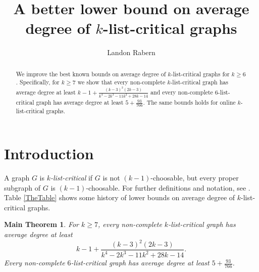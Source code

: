 \documentclass[10pt]{article}
\title{A better lower bound on average degree of $k$-list-critical graphs}
\author{Landon Rabern}
\renewcommand{\ge}{\geqslant}
\theoremstyle{plain}
\newtheorem*{MainTheorem}{Main Theorem}
\theoremstyle{definition}
\theoremstyle{remark}
\begin{document}
\maketitle

\begin{abstract}
		We improve the best known bounds on average degree of $k$-list-critical graphs for $k \ge 6$. 
		Specifically, for $k \ge 7$ we show that every non-complete $k$-list-critical graph has average degree at least $k-1 + \frac{(k-3)^2 (2 k-3)}{k^4-2 k^3-11 k^2+28 k-14}$
		and every non-complete $6$-list-critical graph has average degree at least $5 + \frac{93}{766}$.
		The same bounds holds for online $k$-list-critical graphs.
\end{abstract}

\section{Introduction}
A graph $G$ is \emph{$k$-list-critical} if $G$ is not $(k-1)$-choosable, but every
proper subgraph of $G$ is $(k-1)$-choosable.  For further definitions and notation, see \cite{OreVizing, DischargingLowerBound}. 
Table \ref{TheTable} shows some history of lower bounds on average degree of $k$-list-critical graphs.

\begin{MainTheorem}
For $k \ge 7$, every non-complete $k$-list-critical graph has average degree at least \[k-1 + \frac{(k-3)^2 (2 k-3)}{k^4-2 k^3-11 k^2+28 k-14}.\]
Every non-complete $6$-list-critical graph has average degree at least $5 + \frac{93}{766}$.
\end{MainTheorem}
\end{document}
